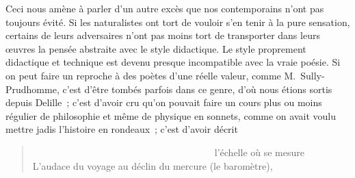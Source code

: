 \documentclass[french,twoside]{book} %
\begin{document}
Ceci nous amène à parler d’un autre excès que nos contemporains n’ont pas toujours évité. Si les naturalistes ont tort de vouloir s’en tenir à la pure sensation, certains de leurs adversaires n’ont pas moins tort de transporter dans leurs œuvres la pensée abstraite avec le style didactique. Le style proprement didactique et technique est devenu presque incompatible avec la vraie poésie. Si on peut faire un reproche à des poètes d’une réelle valeur, comme M. Sully-Prudhomme, c’est d’être tombés parfois dans ce genre, d’où nous étions sortis depuis Delille ; c’est d’avoir cru qu’on pouvait faire un cours plus ou moins régulier de philosophie et même de physique en sonnets, comme on  avait voulu mettre jadis l’histoire en rondeaux ; c’est d’avoir décrit\par


\begin{verse}
                                      l’échelle où se mesure\\
L’audace du voyage au déclin du mercure (le baromètre),\\
\end{verse}
\end{document}
